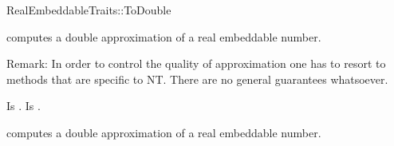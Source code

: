 \begin{ccRefFunctionObjectConcept}{RealEmbeddableTraits::ToDouble}

\ccDefinition

 computes a double approximation of a real
embeddable number. 

Remark: In order to control the quality of approximation one has to resort 
to methods that are specific to NT. There are no general guarantees whatsoever.
 
\ccRefines 



\ccTypes
{} 
        { Is .}
        { Is .}

\ccOperations
{}

        { computes a double approximation of a real embeddable number. }


\ccSeeAlso

\\

\end{ccRefFunctionObjectConcept} 